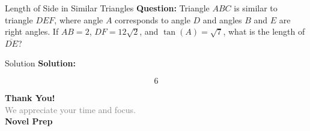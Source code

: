 \documentclass{beamer}
\begin{document}
\begin{frame}{Length of Side in Similar Triangles}
\textbf{Question:}  
Triangle \( ABC \) is similar to triangle \( DEF \), where angle \( A \) corresponds to angle \( D \) and angles \( B \) and \( E \) are right angles. If \( AB = 2 \), \( DF = 12\sqrt{2} \), and \( \tan(A) = \sqrt{7} \), what is the length of \( \overline{DE} \)?
\end{frame}

\begin{frame}{Solution}
\textbf{Solution:}  

\[
\boxed{6}
\]
\end{frame}




\begin{frame}{}

    \centering
    \vspace{5em}

    {\Huge \textbf{\textcolor{novelPurple}{Thank You!}}} \\[1em]
    {\large \textcolor{gray}{We appreciate your time and focus.}} \\[3em]

    {\LARGE \textbf{\textcolor{novelPurple}{\textsf{Novel Prep}}}}

    \vfill
\end{frame}
\end{document}
